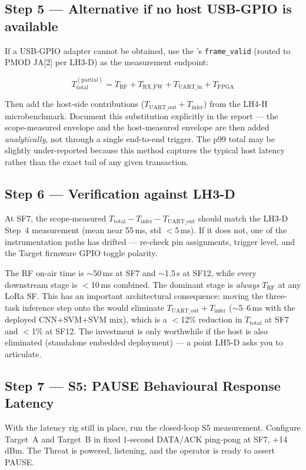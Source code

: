 \documentclass[11pt,letterpaper]{article}
\begin{document}
\subsection{Step 5 --- Alternative if no host USB-GPIO is available}
If a USB-\mbox{GPIO} adapter cannot be obtained, use the \FPGA{}'s \texttt{frame\_valid} (routed to \mbox{PMOD} JA[2] per LH3-D) as the measurement endpoint:

\[
	T_{\text{total}}^{(\text{partial})} = T_{\text{RF}} + T_{\text{RX\_FW}} + T_{\text{UART\_in}} + T_{\text{FPGA}}
\]

Then add the host-side contributions ($T_{\text{UART\_out}} + T_{\text{infer}}$) from the LH4-H microbenchmark. Document this substitution explicitly in the report --- the scope-measured envelope and the host-measured envelope are then added \emph{analytically}, not through a single end-to-end trigger. The p99 total may be slightly under-reported because this method captures the typical host latency rather than the exact tail of any given transaction.

\subsection{Step 6 --- Verification against LH3-D}
At SF7, the scope-measured $T_{\text{total}} - T_{\text{infer}} - T_{\text{UART\_out}}$ should match the LH3-D Step~4 measurement (mean near 55\,ms, std $<$5\,ms). If it does not, one of the instrumentation paths has drifted --- re-check pin assignments, trigger level, and the Target firmware \mbox{GPIO} toggle polarity.

\begin{tcolorbox}[infobox={Why the RF Stage Dominates}]
	The \mbox{RF} on-air time is $\sim$50\,ms at SF7 and $\sim$1.5\,s at SF12, while every downstream stage is $<$10\,ms combined. The dominant stage is \emph{always} $T_{\text{RF}}$ at any LoRa SF. This has an important architectural consequence: moving the three-task inference step onto the \FPGA{} would eliminate $T_{\text{UART\_out}} + T_{\text{infer}}$ ($\sim$5--6\,ms with the deployed CNN+SVM+SVM mix), which is a $<$12\% reduction in $T_{\text{total}}$ at SF7 and $<$1\% at SF12. The investment is only worthwhile if the host is also eliminated (standalone embedded deployment) --- a point LH5-D asks you to articulate.
\end{tcolorbox}

\subsection{Step 7 --- S5: PAUSE Behavioural Response Latency}
With the latency rig still in place, run the closed-loop S5 measurement. Configure Target~A and Target~B in fixed 1-second DATA/ACK ping-pong at SF7, +14\,dBm. The Threat is powered, listening, and the operator is ready to assert PAUSE.
\end{document}
